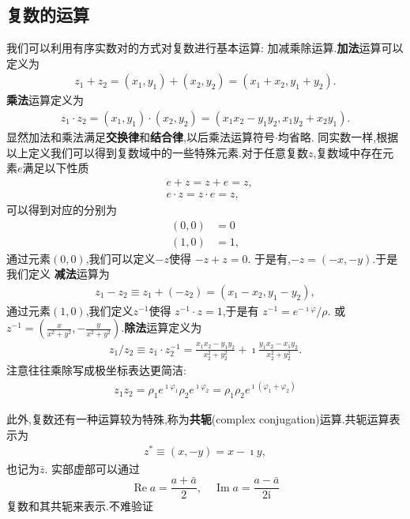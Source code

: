 \subsection{复数的运算}
我们可以利用有序实数对的方式对复数进行基本运算: 加减乘除运算.{\bf 加法}运算可以定义为
\begin{align}
    z_1 + z_2 = (x_1, y_1) + (x_2, y_2) = (x_1 + x_2, y_1 + y_2) .
\end{align}
{\bf 乘法}运算定义为
\begin{align}
    z_1 \cdot z_2 = (x_1, y_1) \cdot (x_2, y_2) = (x_1 x_2 - y_1 y_2, x_1 y_2 + x_2 y_1) .
\end{align}
显然加法和乘法满足{\bf 交换律}和{\bf 结合律},以后乘法运算符号$\cdot$均省略.
同实数一样,根据以上定义我们可以得到复数域中的一些特殊元素.对于任意复数$z$,复数域中存在元素$e$满足以下性质
\begin{align}
    & e + z = z + e = z ,\\ 
    & e \cdot z = z \cdot e = z , 
\end{align}
可以得到对应的分别为
\begin{align}
    (0, 0) &= 0\\
    (1, 0) &= 1 ,
\end{align}
通过元素$(0,0)$,我们可以定义$-z$使得 $-z + z = 0$. 于是有,$- z = (-x, -y)$.于是我们定义
{\bf 减法}运算为 
\begin{align}
    z_1 - z_2 \equiv z_1 + (-z_2) = (x_1 - x_2, y_1 - y_2) ,
\end{align}
通过元素$(1,0)$,我们定义$z^{-1}$使得
$z^{-1} \cdot z = 1$,于是有 $z^{-1} =e^{-\imath \varphi}/\rho  $.
或$z^{-1} = (\frac{x}{x^2 + y^2}, -\frac{y}{x^2 + y^2})$.{\bf 除法}运算定义为
\begin{align}
    z_1 / z_2 \equiv z_1 \cdot z_2^{-1} = \frac{x_1 x_2 - y_1 y_2} {x_2^2  +  y_2^2 }  + \imath \frac{y_1 x_2 - x_1 y_2} {x_2^2  +  y_2^2 } . 
\end{align}
注意往往乘除写成极坐标表达更简洁:
\begin{align}
    z_1 z_2 = \rho_1 e^{\imath \varphi_1 } \rho_2 e^{\imath \varphi_2 } = \rho_1 \rho_2 e^{\imath (\varphi_1 + \varphi_2)}
\end{align}

此外,复数还有一种运算较为特殊,称为{\bf 共轭}(complex conjugation)运算.共轭运算表示为
\begin{align}
    z^{*} \equiv (x, -y) = x - \imath y ,
\end{align}
也记为$\bar{z}$.
实部虚部可以通过
\begin{equation}
    \operatorname{Re} a=\frac{a+\bar{a}}{2}, \quad \operatorname{Im} a=\frac{a-\bar{a}}{2 \mathrm{i}}
\end{equation}
复数和其共轭来表示.不难验证

